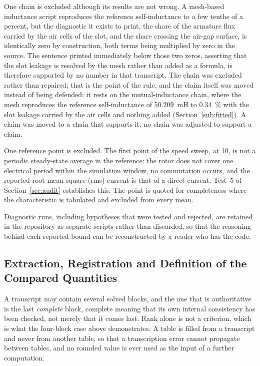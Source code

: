 \documentclass[10pt,a4paper,twocolumn]{article}
\theoremstyle{plain}
\theoremstyle{remark}
\begin{document}
One chain is excluded although its results are not wrong. A mesh-based
inductance script reproduces the reference self-inductance to a few
tenths of a percent, but the diagnostic it exists to print, the share
of the armature flux carried by the air cells of the slot, and the share
crossing the air-gap surface, is identically zero by construction, both
terms being multiplied by zero in the source. The sentence printed
immediately below those two zeros, asserting that the slot leakage is
resolved by the mesh rather than added as a formula, is therefore
supported by no number in that transcript. The chain was excluded rather
than repaired; that is the point of the rule, and the claim itself
was moved instead of being defended: it rests on the mutual-inductance
chain, where the mesh reproduces the reference self-inductance of
\SI{50.209}{\milli\henry} to \SI{0.34}{\percent} with the slot leakage
carried by the air cells and nothing added
(Section~\ref{sub:fitted}). A claim was moved to a chain that supports
it; no chain was adjusted to support a claim.

One reference point is excluded. The first point of the speed sweep, at
\SI{10}{\rpm}, is not a periodic steady-state average in the reference:
the rotor does not cover one electrical period within the simulation
window, no commutation occurs, and the reported root-mean-square (rms) current
is that of a direct current. Test~5 of Section~\ref{sec:audit}
establishes this. The point is quoted for completeness where the
characteristic is tabulated and excluded from every mean.

Diagnostic runs, including hypotheses that were tested and rejected, are
retained in the repository as separate scripts rather than discarded, so
that the reasoning behind each reported bound can be reconstructed by a
reader who has the code.

\subsection{Extraction, Registration and Definition of the Compared Quantities}
\label{sub:extraction}
\label{sub:align}

A transcript may contain several solved blocks, and the one that is
authoritative is the last \emph{complete} block, complete meaning that
its own internal consistency has been checked, not merely that it comes
last.
Rank alone is not a criterion, which is what the four-block case above
demonstrates. A table is filled from a transcript and never from another
table, so that a transcription error cannot propagate between tables,
and no rounded value is ever used as the input of a further computation.
\end{document}
